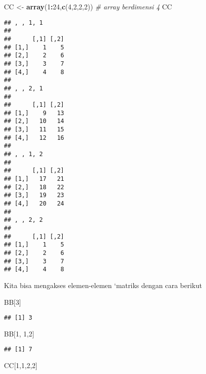 \documentclass[
]{book}
\newenvironment{Shaded}{\begin{snugshade}}{\end{snugshade}}
\newcommand{\CommentTok}[1]{\textcolor[rgb]{0.56,0.35,0.01}{\textit{#1}}}
\newcommand{\DecValTok}[1]{\textcolor[rgb]{0.00,0.00,0.81}{#1}}
\newcommand{\KeywordTok}[1]{\textcolor[rgb]{0.13,0.29,0.53}{\textbf{#1}}}
\newcommand{\NormalTok}[1]{#1}
\newcommand{\OperatorTok}[1]{\textcolor[rgb]{0.81,0.36,0.00}{\textbf{#1}}}
\newcommand{\StringTok}[1]{\textcolor[rgb]{0.31,0.60,0.02}{#1}}
\begin{document}
\begin{Shaded}
\begin{Highlighting}[]
\NormalTok{CC \textless{}{-}}\StringTok{ }\KeywordTok{array}\NormalTok{(}\DecValTok{1}\OperatorTok{:}\DecValTok{24}\NormalTok{,}\KeywordTok{c}\NormalTok{(}\DecValTok{4}\NormalTok{,}\DecValTok{2}\NormalTok{,}\DecValTok{2}\NormalTok{,}\DecValTok{2}\NormalTok{)) }\CommentTok{\# array berdimensi 4}
\NormalTok{CC}
\end{Highlighting}
\end{Shaded}

\begin{verbatim}
## , , 1, 1
## 
##      [,1] [,2]
## [1,]    1    5
## [2,]    2    6
## [3,]    3    7
## [4,]    4    8
## 
## , , 2, 1
## 
##      [,1] [,2]
## [1,]    9   13
## [2,]   10   14
## [3,]   11   15
## [4,]   12   16
## 
## , , 1, 2
## 
##      [,1] [,2]
## [1,]   17   21
## [2,]   18   22
## [3,]   19   23
## [4,]   20   24
## 
## , , 2, 2
## 
##      [,1] [,2]
## [1,]    1    5
## [2,]    2    6
## [3,]    3    7
## [4,]    4    8
\end{verbatim}

Kita bisa mengakses elemen-elemen `matriks dengan cara berikut

\begin{Shaded}
\begin{Highlighting}[]
\NormalTok{BB[}\DecValTok{3}\NormalTok{]}
\end{Highlighting}
\end{Shaded}

\begin{verbatim}
## [1] 3
\end{verbatim}

\begin{Shaded}
\begin{Highlighting}[]
\NormalTok{BB[}\DecValTok{1}\NormalTok{, }\DecValTok{1}\NormalTok{,}\DecValTok{2}\NormalTok{]}
\end{Highlighting}
\end{Shaded}

\begin{verbatim}
## [1] 7
\end{verbatim}

\begin{Shaded}
\begin{Highlighting}[]
\NormalTok{CC[}\DecValTok{1}\NormalTok{,}\DecValTok{1}\NormalTok{,}\DecValTok{2}\NormalTok{,}\DecValTok{2}\NormalTok{]}
\end{Highlighting}
\end{Shaded}
\end{document}

